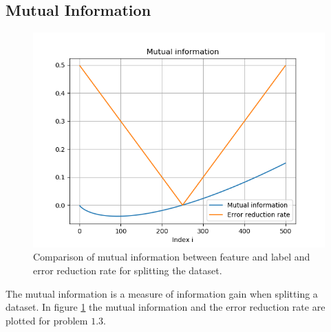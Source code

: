\documentclass[12pt]{article}
\begin{document}
\subsection{Mutual Information}

\begin{figure}[b!]
	\centering
	\includegraphics[width=0.65\linewidth]{../Problem_1/Figure_1.png}
	\caption{Comparison of mutual information between feature and label and error reduction rate for splitting the dataset.}
	\label{fig:1.3}
\end{figure}

The mutual information is a measure of information gain when splitting a dataset. In figure \ref{fig:1.3} the mutual information and the error reduction rate are plotted for problem $1.3$. 











\end{document}
